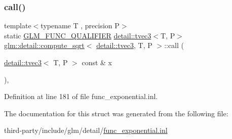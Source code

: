 \subsubsection{\texorpdfstring{call()}{call()}}
{\footnotesize\ttfamily template$<$typename T , precision P$>$ \\
static \hyperlink{setup_8hpp_a33fdea6f91c5f834105f7415e2a64407}{G\+L\+M\+\_\+\+F\+U\+N\+C\+\_\+\+Q\+U\+A\+L\+I\+F\+I\+ER} \hyperlink{structglm_1_1detail_1_1tvec3}{detail\+::tvec3}$<$T, P$>$ \hyperlink{structglm_1_1detail_1_1compute__sqrt}{glm\+::detail\+::compute\+\_\+sqrt}$<$ \hyperlink{structglm_1_1detail_1_1tvec3}{detail\+::tvec3}, T, P $>$\+::call (\begin{DoxyParamCaption}\item[{\hyperlink{structglm_1_1detail_1_1tvec3}{detail\+::tvec3}$<$ T, P $>$ const \&}]{x }\end{DoxyParamCaption})\hspace{0.3cm}{\ttfamily [inline]}, {\ttfamily [static]}}



Definition at line 181 of file func\+\_\+exponential.\+inl.



The documentation for this struct was generated from the following file\+:\begin{DoxyCompactItemize}
\item 
third-\/party/include/glm/detail/\hyperlink{func__exponential_8inl}{func\+\_\+exponential.\+inl}\end{DoxyCompactItemize}
